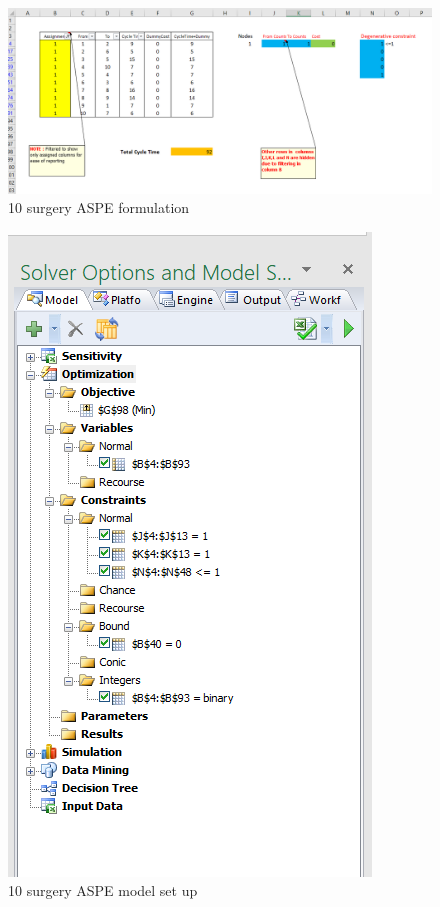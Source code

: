 \documentclass[]{article}
\begin{document}
\begin{figure}[h]

{\centering \includegraphics{Figures/Homework3/p3b} 

}

\caption{10 surgery ASPE formulation}\label{fig:unnamed-chunk-11}
\end{figure}

\begin{figure}[h]

{\centering \includegraphics{Figures/Homework3/modelp3b} 

}

\caption{10 surgery ASPE model set up}\label{fig:unnamed-chunk-12}
\end{figure}
\end{document}
